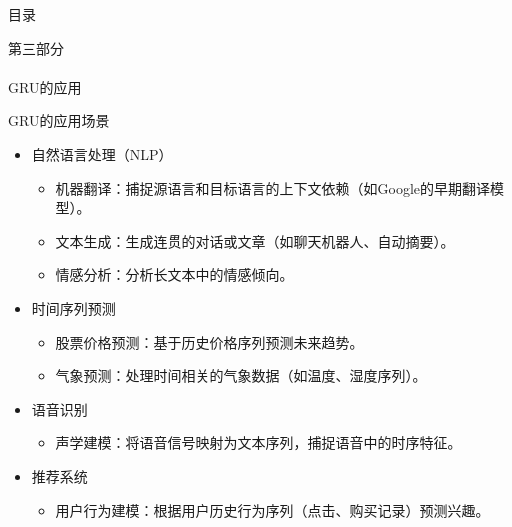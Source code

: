 
\begin{frame}{目录}
        \begin{center}
            \textcolor{NJU_purple}{\Large 第三部分} \\
            \text{\;} \\
            \textcolor{NJU_purple}{\Huge GRU的应用} 
        \end{center}      
    \end{frame}

\begin{frame}{GRU的应用场景}
    \begin{itemize}
        \item 自然语言处理（NLP）
        \begin{itemize}
            \item 机器翻译：捕捉源语言和目标语言的上下文依赖（如Google的早期翻译模型）。
            \item 文本生成：生成连贯的对话或文章（如聊天机器人、自动摘要）。
            \item 情感分析：分析长文本中的情感倾向。
        \end{itemize}
        \item 时间序列预测
        \begin{itemize}
            \item 股票价格预测：基于历史价格序列预测未来趋势。
            \item 气象预测：处理时间相关的气象数据（如温度、湿度序列）。
        \end{itemize}
        \item 语音识别
        \begin{itemize}
            \item 声学建模：将语音信号映射为文本序列，捕捉语音中的时序特征。
        \end{itemize}
        \item 推荐系统
        \begin{itemize}
            \item 用户行为建模：根据用户历史行为序列（点击、购买记录）预测兴趣。
        \end{itemize}
    \end{itemize}
\end{frame}


